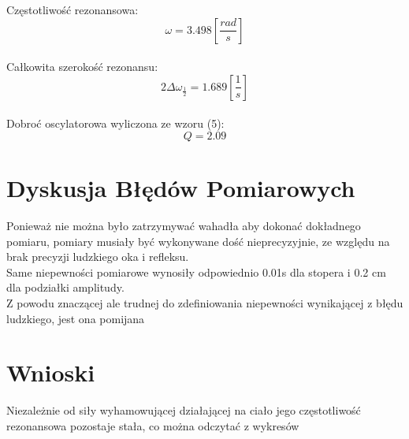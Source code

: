 \documentclass[]{article}
\begin{document}
	Częstotliwość rezonansowa:
	$$\omega = 3.498 \left[ \frac{rad}{s}\right]$$\\
	Całkowita szerokość rezonansu:
	$$2\Delta\omega_{\frac{1}{2}} = 1.689 \left[ \frac{1}{s}\right] $$\\	
	Dobroć oscylatorowa wyliczona ze wzoru (5):
	$$Q = 2.09$$
	
	\section{Dyskusja Błędów Pomiarowych}
	Ponieważ nie można było zatrzymywać wahadła aby dokonać dokładnego pomiaru, pomiary musiały być wykonywane dość nieprecyzyjnie, ze względu na brak precyzji ludzkiego oka i refleksu.\\
	Same niepewności pomiarowe wynosiły odpowiednio 0.01s dla stopera i 0.2 cm dla podziałki amplitudy.\\
	Z powodu znaczącej ale trudnej do zdefiniowania niepewności wynikającej z błędu ludzkiego, jest ona pomijana
	\section{Wnioski}
	Niezależnie od siły wyhamowującej działającej na ciało jego częstotliwość rezonansowa pozostaje stała, co można odczytać z wykresów
\end{document}
